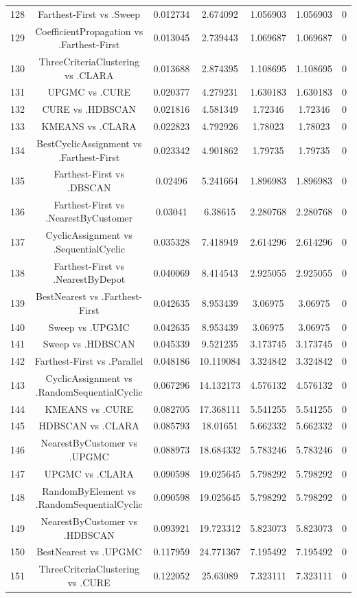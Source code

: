 \documentclass[a4paper,10pt]{article}
\begin{document}
\begin{landscape}
\begin{table}[!htp]
\begin{tabular}{ccccccc}
128&Farthest-First vs .Sweep&0.012734&2.674092&1.056903&1.056903&0\\
129&CoefficientPropagation vs .Farthest-First&0.013045&2.739443&1.069687&1.069687&0\\
130&ThreeCriteriaClustering vs .CLARA&0.013688&2.874395&1.108695&1.108695&0\\
131&UPGMC vs .CURE&0.020377&4.279231&1.630183&1.630183&0\\
132&CURE vs .HDBSCAN&0.021816&4.581349&1.72346&1.72346&0\\
133&KMEANS vs .CLARA&0.022823&4.792926&1.78023&1.78023&0\\
134&BestCyclicAssignment vs .Farthest-First&0.023342&4.901862&1.79735&1.79735&0\\
135&Farthest-First vs .DBSCAN&0.02496&5.241664&1.896983&1.896983&0\\
136&Farthest-First vs .NearestByCustomer&0.03041&6.38615&2.280768&2.280768&0\\
137&CyclicAssignment vs .SequentialCyclic&0.035328&7.418949&2.614296&2.614296&0\\
138&Farthest-First vs .NearestByDepot&0.040069&8.414543&2.925055&2.925055&0\\
139&BestNearest vs .Farthest-First&0.042635&8.953439&3.06975&3.06975&0\\
140&Sweep vs .UPGMC&0.042635&8.953439&3.06975&3.06975&0\\
141&Sweep vs .HDBSCAN&0.045339&9.521235&3.173745&3.173745&0\\
142&Farthest-First vs .Parallel&0.048186&10.119084&3.324842&3.324842&0\\
143&CyclicAssignment vs .RandomSequentialCyclic&0.067296&14.132173&4.576132&4.576132&0\\
144&KMEANS vs .CURE&0.082705&17.368111&5.541255&5.541255&0\\
145&HDBSCAN vs .CLARA&0.085793&18.01651&5.662332&5.662332&0\\
146&NearestByCustomer vs .UPGMC&0.088973&18.684332&5.783246&5.783246&0\\
147&UPGMC vs .CLARA&0.090598&19.025645&5.798292&5.798292&0\\
148&RandomByElement vs .RandomSequentialCyclic&0.090598&19.025645&5.798292&5.798292&0\\
149&NearestByCustomer vs .HDBSCAN&0.093921&19.723312&5.823073&5.823073&0\\
150&BestNearest vs .UPGMC&0.117959&24.771367&7.195492&7.195492&0\\
151&ThreeCriteriaClustering vs .CURE&0.122052&25.63089&7.323111&7.323111&0\\

\end{tabular}
\end{table}
\end{landscape}
\end{document}
